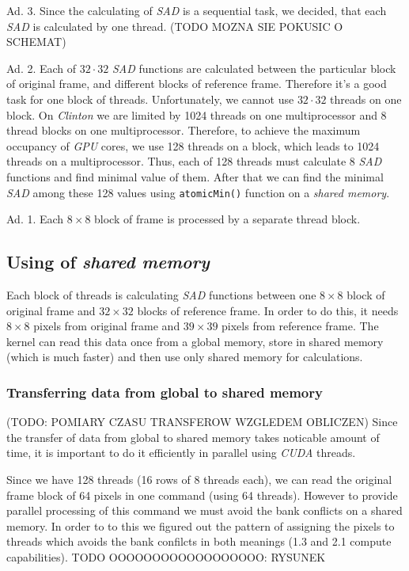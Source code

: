 \documentclass[11pt]{article}
\begin{document}
Ad. 3. Since the calculating of \emph{SAD} is a sequential task, we decided, that
each \emph{SAD} is calculated by one thread. (TODO MOZNA SIE POKUSIC O SCHEMAT)

Ad. 2. Each of $32 \cdot 32$ \emph{SAD} functions are calculated between the
particular block of original frame, and different blocks of reference frame.
Therefore it's a good task for one block of threads.
Unfortunately, we cannot use $32 \cdot 32$ threads on one block.
On \emph{Clinton} we are limited by 1024 threads on one multiprocessor and
8 thread blocks on one multiprocessor.
Therefore, to achieve the maximum occupancy of \emph{GPU} cores, we use 128
threads on a block, which leads to 1024 threads on a multiprocessor.
Thus, each of 128 threads must calculate 8 \emph{SAD} functions and find 
minimal value of them.
After that we can find the minimal \emph{SAD} among these 128 values using
\texttt{atomicMin()} function on a \emph{shared memory}.

Ad. 1. Each $8 \times 8$ block of frame is processed by a separate thread
block.

\subsection{Using of \emph{shared memory}}
Each block of threads is calculating \emph{SAD} functions between one 
$8 \times 8$ block of original frame and $32 \times 32$ blocks of reference
frame. In order to do this, it needs $8 \times 8$ pixels from original
frame and $39 \times 39$ pixels from reference frame.
The kernel can read this data once from a global memory, store in shared
memory (which is much faster) and then use only shared memory for calculations.

\subsubsection{Transferring data from global to shared memory}
(TODO: POMIARY CZASU TRANSFEROW WZGLEDEM OBLICZEN)
Since the transfer of data from global to shared memory takes noticable amount
of time, it is important to do it efficiently in parallel using \emph{CUDA}
threads. 

Since we have 128 threads (16 rows of 8 threads each), we can read the
original frame block of 64 pixels in one command (using 64 threads).
However to provide parallel processing of this command we must avoid the bank
conflicts on a shared memory. In order to to this we figured out the pattern
of assigning the pixels to threads which avoids the bank confilcts in both
meanings (1.3 and 2.1 compute capabilities).
TODO OOOOOOOOOOOOOOOOOO: RYSUNEK
\end{document}
